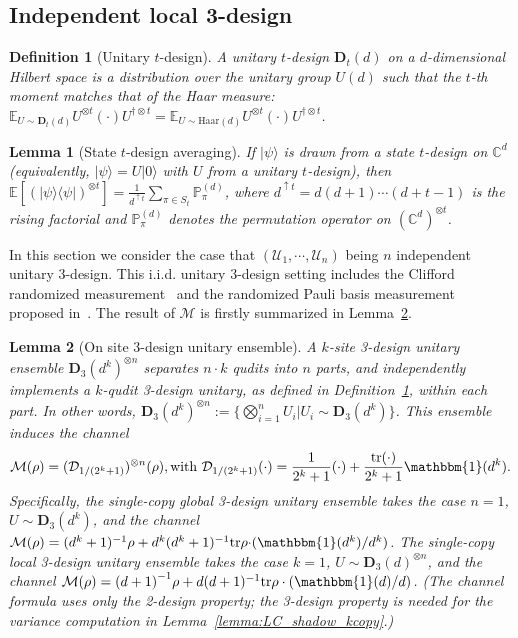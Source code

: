 \documentclass[aps,%
twocolumn,%
floatfix,%
pra,%
amsfonts,%
groupedaddress,%
superscriptaddress]{revtex4-2}%
\newtheorem{lemma}{Lemma}
\newtheorem{definition}{Definition}[section]
\newcommand{\bra}[1]{\langle #1\rvert}
\newcommand{\ket}[1]{\lvert #1\rangle}
\newcommand{\1}{\mathbbm{1}}
\begin{document}
\subsection{Independent local 3-design}
\begin{definition}[Unitary $t$-design]\label{def:t_design}
    A unitary $t$-design $\mathbf{D}_t(d)$ on a $d$-dimensional Hilbert space is a distribution over the unitary group $U(d)$ such that the $t$-th moment matches that of the Haar measure: $\mathbb{E}_{U \sim \mathbf{D}_t(d)} U^{\otimes t} (\cdot) U^{\dagger \otimes t} = \mathbb{E}_{U \sim \mathrm{Haar}(d)} U^{\otimes t} (\cdot) U^{\dagger \otimes t}$.
\end{definition}
\begin{lemma}[State $t$-design averaging]\label{lemma:state_trajectory}
    If $\ket{\psi}$ is drawn from a state $t$-design on $\mathbb{C}^d$ (equivalently, $\ket{\psi} = U\ket{0}$ with $U$ from a unitary $t$-design), then
    $\mathbb{E}\left[\left(\ket{\psi}\!\bra{\psi}\right)^{\otimes t}\right] = \frac{1}{d^{\uparrow t}} \sum_{\pi \in S_t} \mathbb{P}_{\pi}^{(d)}$,
    where $d^{\uparrow t} = d(d+1)\cdots(d+t-1)$ is the rising factorial and $\mathbb{P}_{\pi}^{(d)}$ denotes the permutation operator on $(\mathbb{C}^d)^{\otimes t}$.
\end{lemma}
In this section we consider the case that $(\mathcal{U}_1,\cdots,\mathcal{U}_n)$ being $n$ independent unitary 3-design.
This i.i.d. unitary 3-design setting includes the Clifford randomized measurement~\cite{zhu2016clifford} and the randomized Pauli basis measurement proposed in~\cite{huang2020predicting}.
The result of $\mathcal{M}$ is firstly summarized in Lemma~\ref{lemma:onsite_2design}.
\begin{lemma}[On site 3-design unitary ensemble]\label{lemma:onsite_2design}
    A $k$-site 3-design unitary ensemble $\mathbf{D}_{3}(d^k)^{\otimes n}$ separates $n\cdot k$ qudits into $n$ parts, and independently implements a $k$-qudit 3-design unitary, as defined in Definition~\ref{def:t_design}, within each part. In other words, $\mathbf{D}_{3}(d^k)^{\otimes n}:=\{\bigotimes_{i  =1}^n U_i| U_i \sim \mathbf{D}_{3}(d^k)\}$.
    This ensemble induces the channel
    \begin{align}
        \mathcal{M}(\rho) = (\mathcal{D}_{1/(2^k + 1)})^{\otimes n}(\rho), \text{with~} \mathcal{D}_{1/(2^k + 1)}(\cdot) = \frac{1}{2^k +1}(\cdot) + \frac{\text{tr}(\cdot)}{2^k + 1}{\1(d^k)}.
    \end{align}
    Specifically, the single-copy global 3-design unitary ensemble takes the case $n = 1$, $U \sim \mathbf{D}_{3}(d^k)$, and the channel $     \mathcal{M}(\rho) ={(d^k + 1)^{-1}} \rho + {d^k{(d^k + 1)^{-1}}  \text{tr}\rho \cdot }({\1(d^k)}/{d^k})$.
    The single-copy local 3-design unitary ensemble takes the case $k = 1$, $U \sim \mathbf{D}_{3}(d)^{\otimes n}$, and the channel $ \mathcal{M}(\rho) = {(d + 1)}^{-1} \rho + {d({d + 1})^{-1} \text{tr}\rho} \cdot ({\1(d)}/{d})$.
    (The channel formula uses only the 2-design property; the 3-design property is needed for the variance computation in Lemma~\ref{lemma:LC_shadow_kcopy}.)
\end{lemma}
\end{document}
